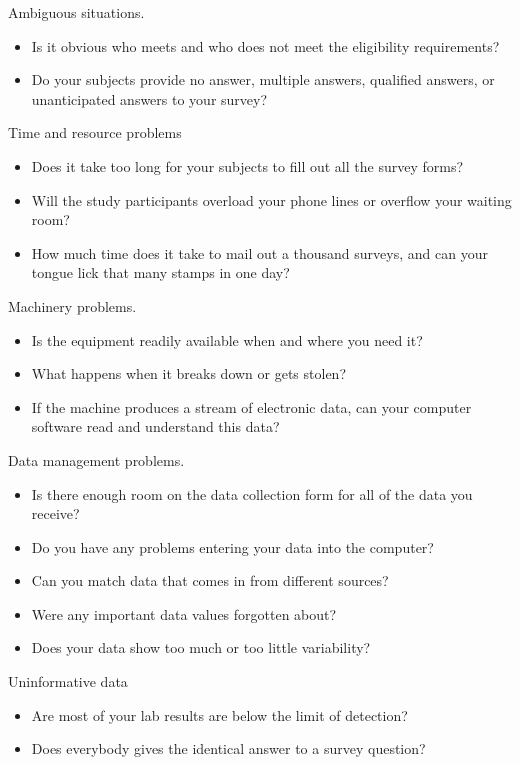 \documentclass[
  letterpaper,
  DIV=11,
  numbers=noendperiod]{scrreprt}
\providecommand{\tightlist}{%
  \setlength{\itemsep}{0pt}\setlength{\parskip}{0pt}}
\begin{document}
Ambiguous situations.

\begin{itemize}
\tightlist
\item
  Is it obvious who meets and who does not meet the eligibility
  requirements?
\item
  Do your subjects provide no answer, multiple answers, qualified
  answers, or unanticipated answers to your survey?
\end{itemize}

Time and resource problems

\begin{itemize}
\tightlist
\item
  Does it take too long for your subjects to fill out all the survey
  forms?
\item
  Will the study participants overload your phone lines or overflow your
  waiting room?
\item
  How much time does it take to mail out a thousand surveys, and can
  your tongue lick that many stamps in one day?
\end{itemize}

Machinery problems.

\begin{itemize}
\tightlist
\item
  Is the equipment readily available when and where you need it?
\item
  What happens when it breaks down or gets stolen?
\item
  If the machine produces a stream of electronic data, can your computer
  software read and understand this data?
\end{itemize}

Data management problems.

\begin{itemize}
\tightlist
\item
  Is there enough room on the data collection form for all of the data
  you receive?
\item
  Do you have any problems entering your data into the computer?
\item
  Can you match data that comes in from different sources?
\item
  Were any important data values forgotten about?
\item
  Does your data show too much or too little variability?
\end{itemize}

Uninformative data

\begin{itemize}
\tightlist
\item
  Are most of your lab results are below the limit of detection?
\item
  Does everybody gives the identical answer to a survey question?
\end{itemize}
\end{document}
